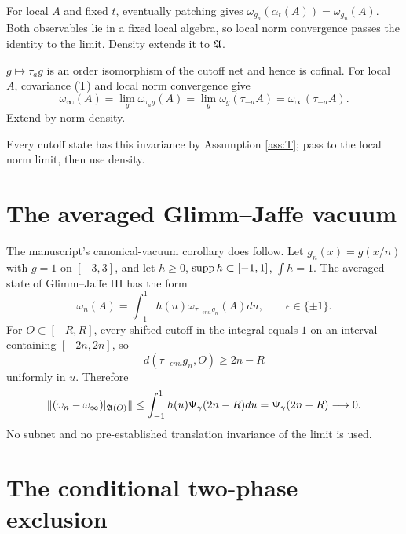 \documentclass[11pt,a4paper]{article}
\begin{document}
\Because For local $A$ and fixed $t$, eventually patching gives
$\omega_{g_n}(\alpha_t(A))=\omega_{g_n}(A)$.  Both observables lie in a fixed
local algebra, so local norm convergence passes the identity to the limit.  Density
extends it to $\mathfrak A$.

\QedStep



\Because $g\mapsto\tau_ag$ is an order isomorphism of the cutoff net and hence is
cofinal.  For local $A$, covariance (T) and local norm convergence give
\[
 \omega_\infty(A)=\lim_g\omega_{\tau_ag}(A)
 =\lim_g\omega_g(\tau_{-a}A)=\omega_\infty(\tau_{-a}A).
\]
Extend by norm density.


\Because Every cutoff state has this invariance by Assumption \ref{ass:T}; pass to
the local norm limit, then use density.

\QedStep

\section{The averaged Glimm--Jaffe vacuum}

The manuscript's canonical-vacuum corollary does follow.  Let
$g_n(x)=g(x/n)$ with $g=1$ on $[-3,3]$, and let
$h\geq0$, $\operatorname{supp} h\subset[-1,1]$, $\int h=1$.  The averaged state of Glimm--Jaffe
III has the form
\[
 \omega_n(A)=\int_{-1}^1h(u)\omega_{\tau_{-\epsilon nu}g_n}(A)du,
 \qquad \epsilon\in\{\pm1\}.
\]
For $O\subset[-R,R]$, every shifted cutoff in the integral equals $1$ on an
interval containing $[-2n,2n]$, so
\[
 d(\tau_{-\epsilon nu}g_n,O)\geq2n-R
\]
uniformly in $u$.  Therefore
\[
 \|(\omega_n-\omega_\infty)|_{\mathfrak A(O)}\|
 \leq\int_{-1}^1h(u)\Psi_\gamma(2n-R)du
 =\Psi_\gamma(2n-R)\longrightarrow0.
\]
No subnet and no pre-established translation invariance of the limit is used.

\section{The conditional two-phase exclusion}
\end{document}
